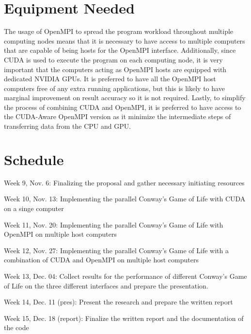 \documentclass[11pt]{article}
\newenvironment{my_enumerate}{
  \begin{enumerate}
    \setlength{\itemsep}{1pt}
      \setlength{\parskip}{0pt}
\setlength{\parsep}{0pt}}{\end{enumerate}
}
\begin{document}
\section {Equipment Needed}\label{equip}

The usage of OpenMPI to spread the program workload throughout multiple computing nodes means that it is necessary to have access to multiple computers that are capable of being hosts for the OpenMPI interface. Additionally, since CUDA is used to execute the program on each computing node, it is very important that the computers acting as OpenMPI hosts are equipped with dedicated NVIDIA GPUs. It is preferred to have all the OpenMPI host computers free of any extra running applications, but this is likely to have marginal improvement on result accuracy so it is not required. Lastly, to simplify the process of combining CUDA and OpenMPI, it is preferred to have access to the CUDA-Aware OpenMPI version as it minimize the intermediate steps of transferring data from the CPU and GPU.

\section {Schedule}\label{sched}

\begin{my_enumerate}
  \item Week 9, Nov. 6: Finalizing the proposal and gather necessary initiating resources
  \item Week 10, Nov. 13: Implementing the parallel Conway's Game of Life with CUDA on a singe computer
  \item Week 11, Nov. 20: Implementing the parallel Conway's Game of Life with OpenMPI on multiple host computers
  \item Week 12, Nov. 27: Implementing the parallel Conway's Game of Life with a combination of CUDA and OpenMPI on multiple host computers
  \item Week 13, Dec. 04: Collect results for the performance of different Conway's Game of Life on the three different interfaces and prepare the presentation.
  \item Week 14, Dec. 11 (pres): Present the research and prepare the written report
  \item Week 15, Dec. 18 (report): Finalize the written report and the documentation of the code
\end{my_enumerate} 
\end{document}
